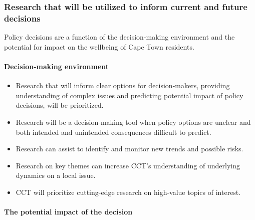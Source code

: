 \documentclass[
]{book}
\providecommand{\tightlist}{%
  \setlength{\itemsep}{0pt}\setlength{\parskip}{0pt}}
\begin{document}
\hypertarget{research-that-will-be-utilized-to-inform-current-and-future-decisions}{%
\subsubsection*{Research that will be utilized to inform current and future decisions}\label{research-that-will-be-utilized-to-inform-current-and-future-decisions}}

Policy decisions are a function of the decision-making environment and the potential for impact on the wellbeing of Cape Town residents.

\hypertarget{decision-making-environment}{%
\paragraph{Decision-making environment}\label{decision-making-environment}}

\begin{itemize}
\tightlist
\item
  Research that will inform clear options for decision-makers, providing understanding of complex issues and predicting potential impact of policy decisions, will be prioritized.
\item
  Research will be a decision-making tool when policy options are unclear and both intended and unintended consequences difficult to predict.
\item
  Research can assist to identify and monitor new trends and possible risks.
\item
  Research on key themes can increase CCT's understanding of underlying dynamics on a local issue.
\item
  CCT will prioritize cutting-edge research on high-value topics of interest.
\end{itemize}

\hypertarget{the-potential-impact-of-the-decision}{%
\paragraph{The potential impact of the decision}\label{the-potential-impact-of-the-decision}}
\end{document}
